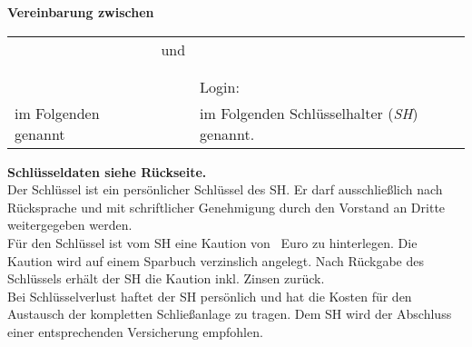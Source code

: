 \begin{Form}
	{\centering
		\large
		\textbf{Vereinbarung zwischen}\\
	}
	\vspace{1em}
	\begin{tabu}{@{}XcX@{}}
		\bingoevNameLang & und & \ShVorname{} \ShName \\
		\bingoevAddrStrasse && \ShAddrStrasse \\
		\bingoevAddrStadt && \ShAddrStadt \\
											 && Login: \ShLogin \\
		im Folgenden \textit{\bingoevName} genannt && im Folgenden Schlüsselhalter (\textit{SH}) genannt.
	\end{tabu}
	
	\textbf{Schlüsseldaten siehe Rückseite.}\\
	
	Der Schlüssel ist ein persönlicher Schlüssel des SH. Er darf ausschließlich nach Rücksprache und mit schriftlicher Genehmigung durch den Vorstand an Dritte weitergegeben werden.\\
	
	Für den Schlüssel ist vom SH eine Kaution von \textbf{\ShKaution}\, Euro zu hinterlegen. Die Kaution wird auf einem Sparbuch verzinslich angelegt. Nach Rückgabe des Schlüssels erhält der SH die Kaution inkl. Zinsen zurück.\\
	
	Bei Schlüsselverlust haftet der SH persönlich und hat die Kosten für den Austausch der kompletten Schließanlage zu tragen. Dem SH wird der Abschluss einer entsprechenden Versicherung empfohlen.
	

\end{Form}
